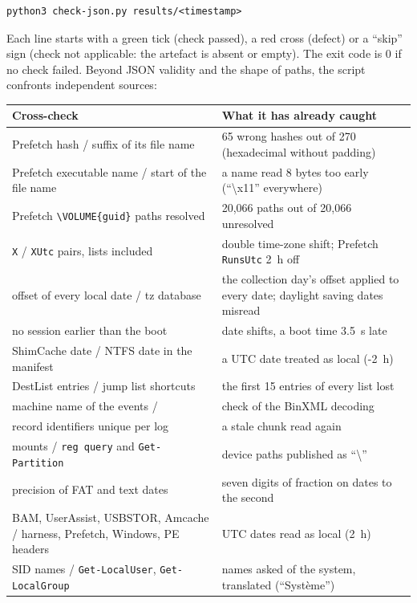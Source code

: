 \documentclass[11pt,a4paper,oneside]{report}
\begin{document}
\begin{lstlisting}
python3 check-json.py results/<timestamp>
\end{lstlisting}

Each line starts with a green tick (check passed), a red cross (defect) or a
``skip'' sign (check not applicable: the artefact is absent or empty). The exit
code is 0 if no check failed. Beyond JSON validity and the shape of paths, the
script confronts independent sources:

\begin{longtable}{@{}L{6.6cm}L{8.4cm}@{}}
\toprule
\textbf{Cross-check} & \textbf{What it has already caught} \\
\midrule
\endhead
Prefetch hash / suffix of its file name & 65 wrong hashes out of 270 (hexadecimal without padding) \\
Prefetch executable name / start of the file name & a name read 8 bytes too early (``\textbackslash x11'' everywhere) \\
Prefetch \texttt{\textbackslash VOLUME\{guid\}} paths resolved & 20,066 paths out of 20,066 unresolved \\
\texttt{X} / \texttt{XUtc} pairs, lists included & double time-zone shift; Prefetch \texttt{RunsUtc} 2~h off \\
offset of every local date / tz database & the collection day's offset applied to every date; daylight saving dates misread \\
no session earlier than the boot & date shifts, a boot time 3.5~s late \\
ShimCache date / NTFS date in the manifest & a UTC date treated as local (-2~h) \\
DestList entries / jump list shortcuts & the first 15 entries of every list lost \\
machine name of the events /  & check of the BinXML decoding \\
record identifiers unique per log & a stale chunk read again \\
mounts / \texttt{reg query} and \texttt{Get-Partition} & device paths published as ``\textbackslash{}'' \\
precision of FAT and text dates & seven digits of fraction on dates to the second \\
BAM, UserAssist, USBSTOR, Amcache / harness, Prefetch, Windows, PE headers & UTC dates read as local (2~h) \\
SID names / \texttt{Get-LocalUser}, \texttt{Get-LocalGroup} & names asked of the system, translated (``Système'') \\

\end{longtable}
\end{document}
